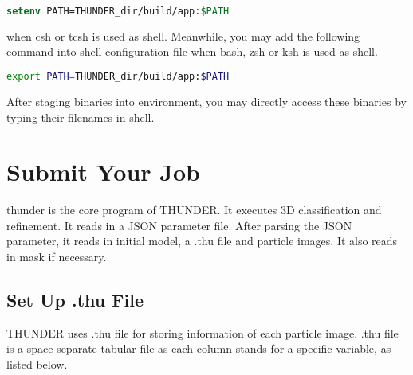 \documentclass{article}
\begin{document}
                \begin{lstlisting}[language={csh}]
setenv PATH=THUNDER_dir/build/app:$PATH
                \end{lstlisting}
                
                when \textsf{csh} or \textsf{tcsh} is used as shell. Meanwhile, you may add the following command into shell configuration file when \textsf{bash}, \textsf{zsh} or \textsf{ksh} is used as shell.
                
                \begin{lstlisting}[language={bash}]
export PATH=THUNDER_dir/build/app:$PATH
                \end{lstlisting}
                
                After staging binaries into environment, you may directly access these binaries by typing their filenames in shell.
                
    \section{Submit Your Job}
    
        \textsf{thunder} is the core program of THUNDER. It executes 3D classification and refinement. It reads in a JSON parameter file. After parsing the JSON parameter, it reads in initial model, a \textsf{.thu} file and particle images. It also reads in mask if necessary.
              
        \subsection{Set Up \textsf{.thu} File}
        
            THUNDER uses \textsf{.thu} file for storing information of each particle image. \textsf{.thu} file is a space-separate tabular file as each column stands for a specific variable, as listed below.
            
\end{document}
